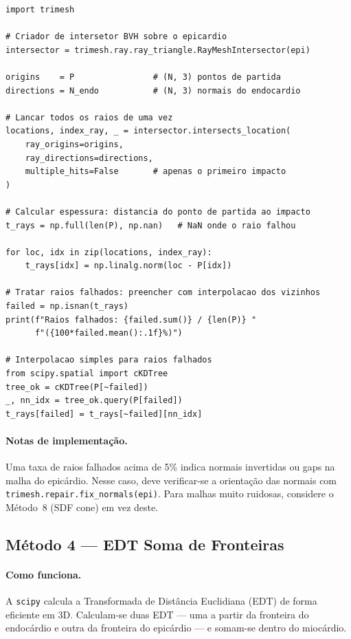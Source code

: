 \begin{lstlisting}
import trimesh

# Criador de intersetor BVH sobre o epicardio
intersector = trimesh.ray.ray_triangle.RayMeshIntersector(epi)

origins    = P                # (N, 3) pontos de partida
directions = N_endo           # (N, 3) normais do endocardio

# Lancar todos os raios de uma vez
locations, index_ray, _ = intersector.intersects_location(
    ray_origins=origins,
    ray_directions=directions,
    multiple_hits=False       # apenas o primeiro impacto
)

# Calcular espessura: distancia do ponto de partida ao impacto
t_rays = np.full(len(P), np.nan)   # NaN onde o raio falhou

for loc, idx in zip(locations, index_ray):
    t_rays[idx] = np.linalg.norm(loc - P[idx])

# Tratar raios falhados: preencher com interpolacao dos vizinhos
failed = np.isnan(t_rays)
print(f"Raios falhados: {failed.sum()} / {len(P)} "
      f"({100*failed.mean():.1f}%)")

# Interpolacao simples para raios falhados
from scipy.spatial import cKDTree
tree_ok = cKDTree(P[~failed])
_, nn_idx = tree_ok.query(P[failed])
t_rays[failed] = t_rays[~failed][nn_idx]
\end{lstlisting}

\paragraph{Notas de implementação.}
Uma taxa de raios falhados acima de 5\% indica normais invertidas
ou gaps na malha do epicárdio. Nesse caso, deve verificar-se a
orientação das normais com \texttt{trimesh.repair.fix\_normals(epi)}.
Para malhas muito ruidosas, considere o Método~8 (SDF cone) em vez
deste.

\subsection{Método 4 --- EDT Soma de Fronteiras}
\label{impl:edt}

\paragraph{Como funciona.}
A \texttt{scipy} calcula a Transformada de Distância Euclidiana
(EDT) de forma eficiente em 3D. Calculam-se duas EDT --- uma
a partir da fronteira do endocárdio e outra da fronteira do
epicárdio --- e somam-se dentro do miocárdio.

